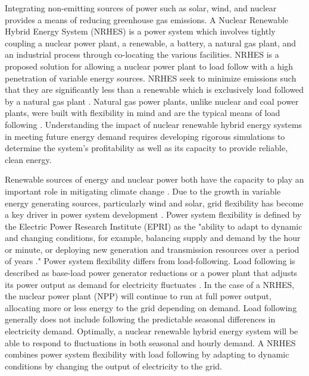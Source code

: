 \documentclass[12pt]{UIdahoMastersThesis}
\begin{document}
Integrating non-emitting sources of power such as solar, wind, and nuclear provides a means of reducing greenhouse gas emissions. A Nuclear Renewable Hybrid Energy System (NRHES) is a power system which involves tightly coupling a nuclear power plant, a renewable, a battery, a natural gas plant, and an industrial process through co-locating the various facilities.  NRHES is a proposed solution for allowing a nuclear power plant to load follow with a high penetration of variable energy sources. NRHES seek to minimize emissions such that they are significantly less than a renewable which is exclusively load followed by a natural gas plant \cite{Baker2016}.  Natural gas power plants, unlike nuclear and coal power plants, were built with flexibility in mind and are the typical means of load following \cite{MITEnergyInitiative2011}.  Understanding the impact of nuclear renewable hybrid energy systems in meeting future energy demand requires developing rigorous simulations to determine the system's profitability as well as its capacity to provide reliable, clean energy. 

Renewable sources of energy and nuclear power both have the capacity to play an important role in mitigating climate change \cite {IPCC}. Due to the growth in variable energy generating sources, particularly wind and solar, grid flexibility has become a key driver in power system development \cite {Denholm2011}. Power system flexibility is defined by the Electric Power Research Institute (EPRI) as the "ability to adapt to dynamic and changing conditions, for example, balancing supply and demand by the hour or minute, or deploying new generation and transmission resources over a period of years \cite{EPRI2016}." Power system flexibility differs from load-following.  Load following is described as base-load power generator reductions \cite{Bragg-Sitton2014} or a power plant that adjusts its power output as demand for electricity fluctuates \cite{Masters2004}. In the case of a NRHES, the nuclear power plant (NPP) will continue to run at full power output, allocating more or less energy to the grid depending on demand. Load following generally does not include following the predictable seasonal differences in electricity demand.  Optimally, a nuclear renewable hybrid energy system will be able to respond to fluctuations in both seasonal and hourly demand. A NRHES combines power system flexibility with load following by adapting to dynamic conditions by changing the output of electricity to the grid.
\end{document}

